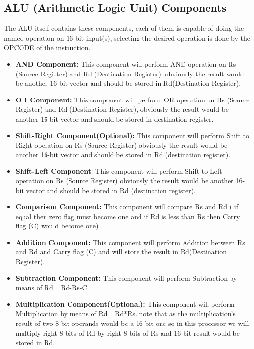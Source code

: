 \documentclass{report}
\begin{document}
    \subsection{ALU (Arithmetic Logic Unit) Components}
    The ALU itself contains these components, each of them is capable of doing the named operation on 16-bit input(s), selecting the desired operation is done by the OPCODE of the instruction. 
    \begin{itemize}
        \item \textbf{AND Component:}
            This component will perform AND operation on Rs (Source Register) and Rd 			(Destination Register), obviously the result would be another 16-bit vector and 			should be stored in Rd(Destination Register).
        \item \textbf{OR Component:}
            This component will perform OR operation on Rs (Source Register) and Rd (Destination Register), obviously the result would be another 16-bit vector and 			should be stored in destination register.
        \item \textbf{Shift-Right Component(Optional):}
            This component will perform Shift to Right operation on Rs (Source Register) 			obviously the result would be another 16-bit vector and should be stored in 			Rd (destination register).
        \item \textbf{Shift-Left Component:}
            This component will perform Shift to Left operation on Rs (Source Register) 			obviously the result would be another 16-bit vector and should be stored in 			Rd (destination register).
        \item \textbf{Comparison Component:}
            This component will compare Rs and Rd ( if equal then zero flag must become 			one and if Rd is less than Rs then Carry flag (C) would become one)
        \item \textbf{Addition Component:}
            This component will perform Addition between Rs and Rd and Carry flag (C) and 			will store the result in Rd(Destination Register).
        \item \textbf{Subtraction Component:}
            This component will perform Subtraction by means of Rd =Rd-Rs-C.
        \item \textbf{Multiplication Component(Optional):}
            This component will perform Multiplication by means of Rd =Rd*Rs. note that as the multiplication's result of two 8-bit operands would be a 16-bit one so in this processor we will multiply right 8-bits of Rd by right 8-bits of Rs and 16 bit result 			would be stored in Rd.

\end{itemize}
\end{document}
